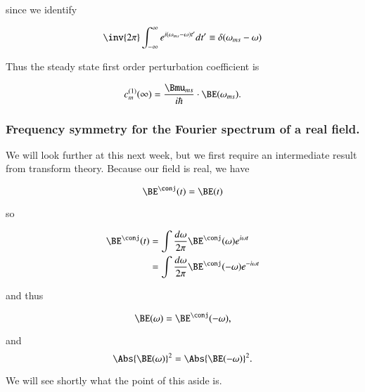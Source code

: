 since we identify

\begin{equation}\label{eqn:qmTwoL7:570b}
\inv{2 \pi}
\int_{-\infty}^\infty
e^{i (\omega_{ms} -\omega) t'} dt' \equiv \delta(\omega_{ms} - \omega)
\end{equation}

Thus the steady state first order perturbation coefficient is

\begin{equation}\label{eqn:qmTwoL7:590b}
c_m^{(1)}(\infty)
=
\frac{\Bmu_{ms}}{i \hbar} \cdot
\BE(\omega_{ms}).
\end{equation}

\subsubsection{Frequency symmetry for the Fourier spectrum of a real field.}

We will look further at this next week, but we first require an intermediate result from transform theory.  Because our field is real, we have

\begin{equation}\label{eqn:qmTwoL7:610}
\BE^\conj(t) = \BE(t)
\end{equation}

so

\begin{align*}
\BE^\conj(t)
&= \int \frac{d\omega}{2 \pi} \BE^\conj(\omega) e^{i \omega t} \\
&= \int \frac{d\omega}{2 \pi} \BE^\conj(-\omega) e^{-i \omega t} \\
\end{align*}

and thus

\begin{equation}\label{eqn:qmTwoL7:630}
\BE(\omega) = \BE^\conj(-\omega),
\end{equation}

and
\begin{equation}\label{eqn:qmTwoL7:650}
\Abs{\BE(\omega)}^2 = \Abs{\BE(-\omega)}^2.
\end{equation}

We will see shortly what the point of this aside is.

\EndArticle
